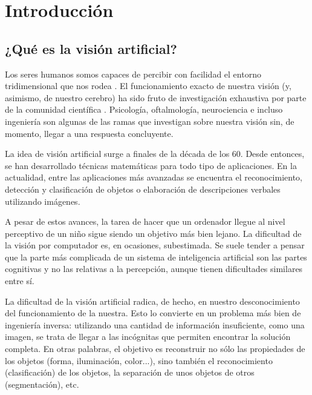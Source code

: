 \section{Introducción}

\subsection{¿Qué es la visión artificial?}

Los seres humanos somos capaces de percibir con facilidad el entorno tridimensional que nos rodea \cite{tfg}. El funcionamiento exacto de nuestra visión (y, asimismo, de nuestro cerebro)  ha sido fruto de investigación exhaustiva por parte de la comunidad científica \cite{book:szeliski}. Psicología, oftalmología, neurociencia e incluso ingeniería son algunas de las ramas que investigan sobre nuestra visión sin, de momento, llegar a una respuesta concluyente.

La idea de visión artificial surge a finales de la década de los 60. Desde entonces, se han desarrollado técnicas matemáticas para todo tipo de aplicaciones. En la actualidad, entre las aplicaciones más avanzadas se encuentra el reconocimiento, detección y clasificación de objetos o elaboración de descripciones verbales utilizando imágenes.

A pesar de estos avances, la tarea de hacer que un ordenador llegue al nivel perceptivo de un niño sigue siendo un objetivo más bien lejano. La dificultad de la visión por computador es, en ocasiones, subestimada. Se suele tender a pensar que la parte más complicada de un sistema de inteligencia artificial son las partes cognitivas y no las relativas a la percepción, aunque tienen dificultades similares entre sí.

La dificultad de la visión artificial radica, de hecho, en nuestro desconocimiento del funcionamiento de la nuestra. Esto lo convierte en un problema más bien de ingeniería inversa: utilizando una cantidad de información insuficiente, como una imagen, se trata de llegar a las incógnitas que permiten encontrar la solución completa. En otras palabras, el objetivo es reconstruir no sólo las propiedades de los objetos (forma, iluminación, color...), sino también el reconocimiento (clasificación) de los objetos, la separación de unos objetos de otros (segmentación), etc.

